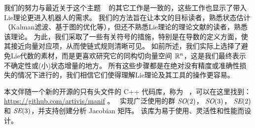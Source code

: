 我们的努力与最近关于这个主题 ~\cite{BARFOOT-17-Estimation,EADE-Lie,forster2017-TRO} 的其它工作是一致的，这些工作也显示了带入Lie理论更进入机器人的需求。
我们的方法旨在让本文的目标读者，熟悉状态估计（Kalman滤波、基于图的优化等），但还不熟悉Lie理论的理论文献的读者，熟悉该理论。
%
为此，我们采取了一些有关符号的措施，特别是在导数的定义方面，使其接近向量对应项，从而使链式规则清晰可见。
如前所述，我们实际上选择了避免Lie代数的素材，而是更喜欢研究它的同构切向量空间 ${\mathbb R}^n$，这是我们最终表示不确定性或(小)状态增量的地方。
所有这些步骤都是在绝对没有精度或准确性损失的情况下进行的，我们相信它们使得理解Lie理论及其工具的操作更容易。

本文伴随一个新的开源的只有头文件的 C++ 代码库，称为 \manif\ \cite{DERAY-20-manif}，可以在这里找到： \url{https://github.com/artivis/manif} 。
\manif\ 实现广泛使用的群 $\textit{SO}(2)$， $\textit{SO}(3)$， $\textit{SE}(2)$ 和 $\textit{SE}(3)$，并支持创建分析 Jacobian 矩阵。
该库为易于使用、灵活性和性能而设计。

